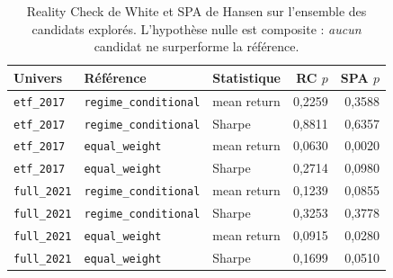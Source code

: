 \newcommand{\correctionVerdict}{Aucun des 240 candidats ne bat la stratégie à régimes une fois la recherche prise en compte, sur aucun des deux univers.}
\newcommand{\correctionCandidats}{240}

\begin{table}[htbp]
  \centering
  \small
  \caption[Correction pour tests multiples]{Reality Check de White et SPA de Hansen sur l'ensemble des candidats explorés. L'hypothèse nulle est composite : \emph{aucun} candidat ne surperforme la référence.}
  \label{tab:correction}
  \begin{tabular}{@{}lllrr@{}}
    \toprule
    Univers & Référence & Statistique & RC $p$ & SPA $p$ \\
    \midrule
    \texttt{etf\_2017} & \texttt{regime\_conditional} & mean return & 0,2259 & 0,3588 \\
    \texttt{etf\_2017} & \texttt{regime\_conditional} & Sharpe & 0,8811 & 0,6357 \\
    \texttt{etf\_2017} & \texttt{equal\_weight} & mean return & 0,0630 & 0,0020 \\
    \texttt{etf\_2017} & \texttt{equal\_weight} & Sharpe & 0,2714 & 0,0980 \\
    \texttt{full\_2021} & \texttt{regime\_conditional} & mean return & 0,1239 & 0,0855 \\
    \texttt{full\_2021} & \texttt{regime\_conditional} & Sharpe & 0,3253 & 0,3778 \\
    \texttt{full\_2021} & \texttt{equal\_weight} & mean return & 0,0915 & 0,0280 \\
    \texttt{full\_2021} & \texttt{equal\_weight} & Sharpe & 0,1699 & 0,0510 \\
    \bottomrule
  \end{tabular}
\end{table}
